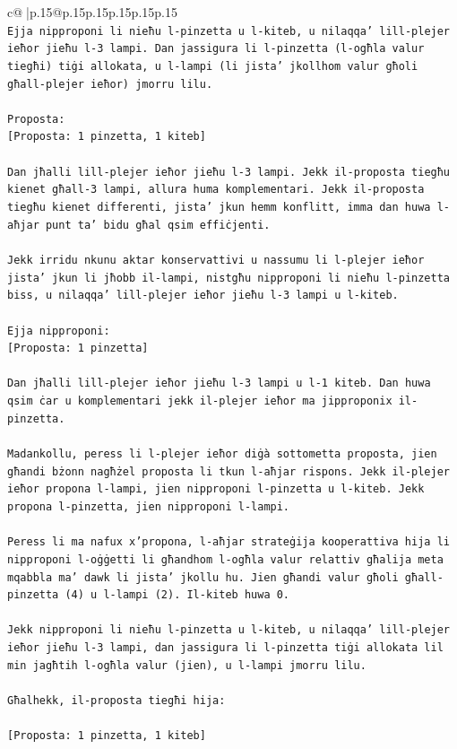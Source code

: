 \documentclass{article}
\begin{document}
{\begin{supertabular}{c@{$\;$}|p{.15\linewidth}@{}p{.15\linewidth}p{.15\linewidth}p{.15\linewidth}p{.15\linewidth}p{.15\linewidth}}
{{{\\ 
\texttt{Ejja nipproponi li nieħu l{-}pinzetta u l{-}kiteb, u nilaqqa' lill{-}plejer ieħor jieħu l{-}3 lampi. Dan jassigura li l{-}pinzetta (l{-}ogħla valur tiegħi) tiġi allokata, u l{-}lampi (li jista' jkollhom valur għoli għall{-}plejer ieħor) jmorru lilu.} \\
\\ 
\texttt{Proposta:} \\
\texttt{{[}Proposta: 1 pinzetta, 1 kiteb{]}} \\
\\ 
\texttt{Dan jħalli lill{-}plejer ieħor jieħu l{-}3 lampi. Jekk il{-}proposta tiegħu kienet għall{-}3 lampi, allura huma komplementari. Jekk il{-}proposta tiegħu kienet differenti, jista' jkun hemm konflitt, imma dan huwa l{-}aħjar punt ta' bidu għal qsim effiċjenti.} \\
\\ 
\texttt{Jekk irridu nkunu aktar konservattivi u nassumu li l{-}plejer ieħor jista' jkun li jħobb il{-}lampi, nistgħu nipproponi li nieħu l{-}pinzetta biss, u nilaqqa' lill{-}plejer ieħor jieħu l{-}3 lampi u l{-}kiteb.} \\
\\ 
\texttt{Ejja nipproponi:} \\
\texttt{{[}Proposta: 1 pinzetta{]}} \\
\\ 
\texttt{Dan jħalli lill{-}plejer ieħor jieħu l{-}3 lampi u l{-}1 kiteb. Dan huwa qsim ċar u komplementari jekk il{-}plejer ieħor ma jipproponix il{-}pinzetta.} \\
\\ 
\texttt{Madankollu, peress li l{-}plejer ieħor diġà sottometta proposta, jien għandi bżonn nagħżel proposta li tkun l{-}aħjar rispons. Jekk il{-}plejer ieħor propona l{-}lampi, jien nipproponi l{-}pinzetta u l{-}kiteb. Jekk propona l{-}pinzetta, jien nipproponi l{-}lampi.} \\
\\ 
\texttt{Peress li ma nafux x'propona, l{-}aħjar strateġija kooperattiva hija li nipproponi l{-}oġġetti li għandhom l{-}ogħla valur relattiv għalija meta mqabbla ma' dawk li jista' jkollu hu. Jien għandi valur għoli għall{-}pinzetta (4) u l{-}lampi (2). Il{-}kiteb huwa 0.} \\
\\ 
\texttt{Jekk nipproponi li nieħu l{-}pinzetta u l{-}kiteb, u nilaqqa' lill{-}plejer ieħor jieħu l{-}3 lampi, dan jassigura li l{-}pinzetta tiġi allokata lil min jagħtih l{-}ogħla valur (jien), u l{-}lampi jmorru lilu.} \\
\\ 
\texttt{Għalhekk, il{-}proposta tiegħi hija:} \\
\\ 
\texttt{{[}Proposta: 1 pinzetta, 1 kiteb{]}} \\
            }
        }
    }
     \\ \\


\end{supertabular}}
\end{document}
